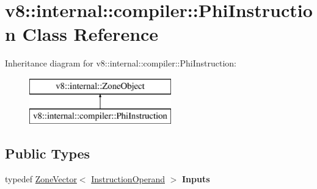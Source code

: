 \hypertarget{classv8_1_1internal_1_1compiler_1_1_phi_instruction}{}\section{v8\+:\+:internal\+:\+:compiler\+:\+:Phi\+Instruction Class Reference}
\label{classv8_1_1internal_1_1compiler_1_1_phi_instruction}
Inheritance diagram for v8\+:\+:internal\+:\+:compiler\+:\+:Phi\+Instruction\+:\begin{figure}[H]
\begin{center}
\leavevmode
\includegraphics[height=2.000000cm]{classv8_1_1internal_1_1compiler_1_1_phi_instruction}
\end{center}
\end{figure}
\subsection*{Public Types}
\begin{DoxyCompactItemize}
\item 
typedef \hyperlink{classv8_1_1internal_1_1_zone_vector}{Zone\+Vector}$<$ \hyperlink{classv8_1_1internal_1_1compiler_1_1_instruction_operand}{Instruction\+Operand} $>$ {\bfseries Inputs}\hypertarget{classv8_1_1internal_1_1compiler_1_1_phi_instruction_ab3e2fb4170336928ff7ba714359e7856}{}\label{classv8_1_1internal_1_1compiler_1_1_phi_instruction_ab3e2fb4170336928ff7ba714359e7856}

\end{DoxyCompactItemize}
